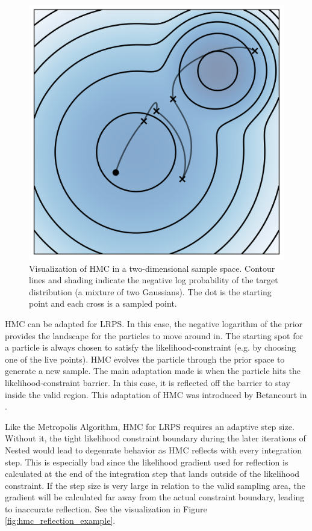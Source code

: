 \documentclass[12pt, a4paper]{report}
\begin{document}
\begin{figure}
    \centering
    \includegraphics[scale=0.8]{figs/hmc_example.png}
    \caption{Visualization of HMC in a two-dimensional sample space. Contour lines and shading indicate the negative log probability of the target distribution (a mixture of two Gaussians). The dot is the starting point and each cross is a sampled point.}
    \label{fig:hmc_example}
\end{figure}

HMC can be adapted for LRPS.
In this case, the negative logarithm of the prior provides the landscape for the particles to move around in.
The starting spot for a particle is always chosen to satisfy the likelihood-constraint (e.g. by choosing one of the live points).
HMC evolves the particle through the prior space to generate a new sample.
The main adaptation made is when the particle hits the likelihood-constraint barrier.
In this case, it is reflected off the barrier to stay inside the valid region.
This adaptation of HMC was introduced by Betancourt in \cite{hmc_in_ns}.

Like the Metropolis Algorithm, HMC for LRPS requires an adaptive step size.
Without it, the tight likelihood constraint boundary during the later iterations of Nested would lead to degenrate behavior as HMC reflects with every integration step.
This is especially bad since the likelihood gradient used for reflection is calculated at the end of the integration step that lands outside of the likelihood constraint.
If the step size is very large in relation to the valid sampling area, the gradient will be calculated far away from the actual constraint boundary, leading to inaccurate reflection.
See the visualization in Figure \ref{fig:hmc_reflection_example}.
\end{document}

